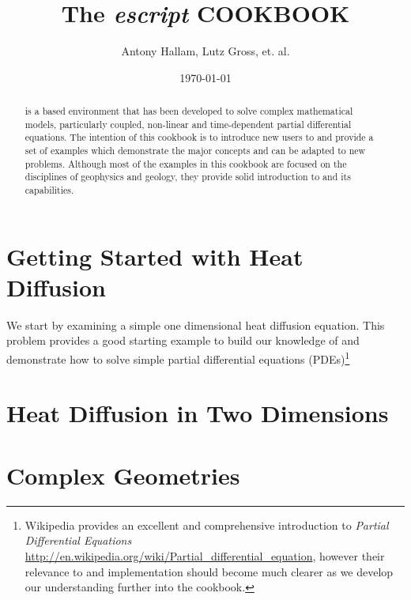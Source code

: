\documentclass{manual}
\title{The \textit{escript} COOKBOOK}
\author{Antony Hallam, Lutz Gross, et. al.}
\date{\today}
\begin{document}
\maketitle

\ifpdf
{}
\fi



\begin{abstract}
\esc is a \pyt based environment that has been developed to solve complex mathematical models, particularly coupled, non-linear and time-dependent partial differential equations. The intention of this cookbook is to introduce new users to \esc and provide a set of examples which demonstrate the major concepts and can be adapted to new problems. Although most of the examples in this cookbook are focused on the disciplines of geophysics and geology, they provide solid introduction to \esc and its capabilities.
\end{abstract}
\tableofcontents

\newpage




\chapter{Getting Started with Heat Diffusion}
\label{CHAP HEAT DIFF}
We start by examining a simple one dimensional heat diffusion equation. This problem provides a good starting example to build our knowledge of \esc and demonstrate how to solve simple partial differential equations (PDEs)\footnote{Wikipedia provides an excellent and comprehensive introduction to \textit{Partial Differential Equations} \url{http://en.wikipedia.org/wiki/Partial_differential_equation}, however their relevance to \esc and implementation should become much clearer as we develop our understanding further into the cookbook.}



\chapter{Heat Diffusion in Two Dimensions}
\label{CHAP HEAT 2a}



\chapter{Complex Geometries}
\label{CHAP HEAT 2}


% 


\end{document}
